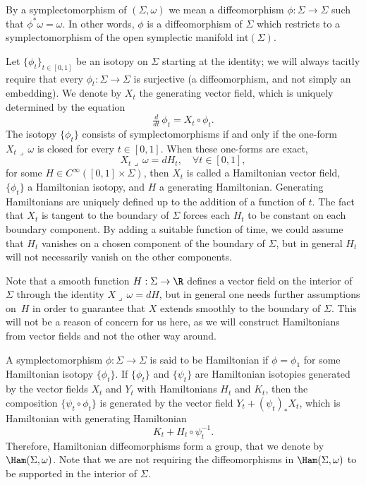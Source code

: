 By a symplectomorphism of $(\Sigma,\omega)$ we mean a diffeomorphism $\phi: \Sigma \to \Sigma$ such that $\phi^* \omega = \omega$. In other words, $\phi$ is a diffeomorphism of $\Sigma$ which restricts to a symplectomorphism of the open symplectic manifold $\mathrm{int}(\Sigma)$.

Let $\{\phi_t\}_{t\in [0,1]}$ be an isotopy on $\Sigma$ starting at the identity; we will always tacitly require that every $\phi_t:\Sigma\to\Sigma$ is surjective (\ie a diffeomorphism, and not simply an embedding). We denote by $X_t$ the generating vector field, which is uniquely determined by the equation
\[
\tfrac{d}{dt}\, \phi_t = X_t\circ\phi_t.
\]
The isotopy $\{\phi_t\}$ consists of symplectomorphisms if and only if the one-form $X_t \lrcorner \,\omega$ is closed for every $t\in [0,1]$. When these one-forms are exact, \ie
\[
X_t \lrcorner \,\omega = dH_t, \quad \forall t\in [0,1],
\]
for some $H\in C^{\infty}([0,1]\times \Sigma)$, then $X_t$ is called a Hamiltonian vector field, $\{\phi_t\}$ a Hamiltonian isotopy, and $H$ a generating Hamiltonian. Generating Hamiltonians are uniquely defined up to the addition of a function of $t$. The fact that $X_t$ is tangent to the boundary of $\Sigma$ forces each $H_t$ to be constant on each boundary component. By adding a suitable function of time, we could assume that $H_t$ vanishes on a chosen component of the boundary of $\Sigma$, but in general $H_t$ will not necessarily vanish on the other components.

Note that a smooth function $H:\Sigma\to\R$ defines a vector field on the interior of~$\Sigma$ through the identity $X \lrcorner \,\omega = dH$, but in general one needs further assumptions on~$H$ in order to guarantee that $X$ extends smoothly to the boundary of $\Sigma$. This will not be a reason of concern for us here, as we will construct Hamiltonians from vector fields and not the other way around.

A symplectomorphism $\phi: \Sigma \to \Sigma$ is said to be Hamiltonian if $\phi=\phi_1$ for some Hamiltonian isotopy $\{\phi_t\}$. If $\{\phi_t\}$ and $\{\psi_t\}$ are Hamiltonian isotopies generated by the vector fields $X_t$ and $Y_t$ with Hamiltonians $H_t$ and $K_t$, then the composition $\{\psi_t \circ \phi_t\}$ is generated by the vector field $Y_t + (\psi_t)_* X_t$, which is Hamiltonian with generating Hamiltonian
\begin{equation}
\label{hamprod}
K_t + H_t \circ \psi_t^{-1}.
\end{equation}
Therefore, Hamiltonian diffeomorphisms form a group, that we denote by~$\Ham(\Sigma,\omega)$. Note that we are not requiring the diffeomorphisms in $\Ham(\Sigma,\omega)$ to be supported in the interior of $\Sigma$.


